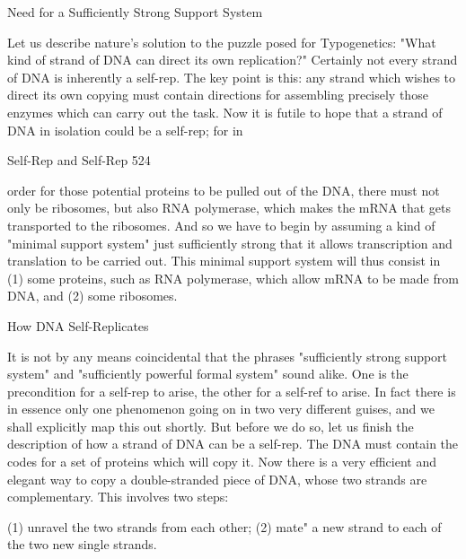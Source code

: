 {                      Need for a Sufficiently Strong Support System

Let us describe nature's solution to the puzzle posed for Typogenetics: "What kind of strand
of DNA can direct its own replication?" Certainly not every strand of DNA is inherently a
self-rep. The key point is this: any strand which wishes to direct its own copying must
contain directions for assembling precisely those enzymes which can carry out the task. Now
it is futile to hope that a strand of DNA in isolation could be a self-rep; for in




Self-Rep and Self-Rep                                                                     524

order for those potential proteins to be pulled out of the DNA, there must not only be
ribosomes, but also RNA polymerase, which makes the mRNA that gets transported to the
ribosomes. And so we have to begin by assuming a kind of "minimal support system" just
sufficiently strong that it allows transcription and translation to be carried out. This minimal
support system will thus consist in (1) some proteins, such as RNA polymerase, which allow
mRNA to be made from DNA, and (2) some ribosomes.

                                 How DNA Self-Replicates

It is not by any means coincidental that the phrases "sufficiently strong support system" and
"sufficiently powerful formal system" sound alike. One is the precondition for a self-rep to
arise, the other for a self-ref to arise. In fact there is in essence only one phenomenon going
on in two very different guises, and we shall explicitly map this out shortly. But before we do
so, let us finish the description of how a strand of DNA can be a self-rep.
         The DNA must contain the codes for a set of proteins which will copy it. Now there
is a very efficient and elegant way to copy a double-stranded piece of DNA, whose two
strands are complementary. This involves two steps:

      (1) unravel the two strands from each other;
      (2) mate" a new strand to each of the two new single strands.

}
